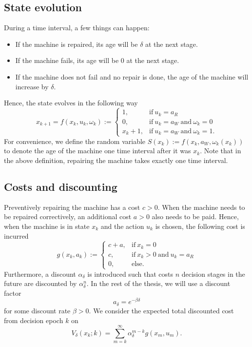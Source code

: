 \documentclass[a4paper]{thesis}
\theoremstyle{definition}
\begin{document}
\subsection{State evolution}
During a time interval, a few things can happen:
\begin{itemize}
	\item If the machine is repaired, its age will be $\delta$ at the next stage.
	\item If the machine fails, its age will be $0$ at the next stage.
	\item If the machine does not fail and no repair is done, the age of the machine will increase by $\delta$.
\end{itemize}
Hence, the state evolves in the following way
$$
x_{k+1}=f(x_k,u_k,\omega_k):=\begin{cases}
1,&\text{if}\ u_k=a_R \\
0,&\text{if}\ u_k=a_W\ \text{and}\ \omega_k=0 \\
x_k+1,&\text{if}\ u_k=a_W\ \text{and}\ \omega_k=1.
\end{cases}
$$
For convenience, we define the random variable $S(x_k):=f(x_k,a_W,\omega_k(x_k))$ to denote the age of the machine one time interval after it was $x_k$.
Note that in the above definition, repairing the machine takes exactly one time interval.

\subsection{Costs and discounting}
Preventively repairing the machine has a cost $c>0$.
When the machine needs to be repaired correctively, an additional cost $a>0$ also needs to be paid.
Hence, when the machine is in state $x_k$ and the action $u_k$ is chosen, the following cost is incurred
$$
g(x_k,a_k):=\begin{cases}
c+a,&\text{if}\ x_k=0 \\
c,&\text{if}\ x_k>0\ \text{and}\ u_k=a_R \\
0,&\text{else}.
\end{cases}
$$
Furthermore, a discount $\alpha_\delta$ is introduced such that costs $n$ decision stages in the future are discounted by $\alpha_\delta^n$.
In the rest of the thesis, we will use a discount factor
$$
a_\delta=e^{-\beta\delta}
$$
for some discount rate $\beta>0$.
We consider the expected total discounted cost from decision epoch $k$ on
$$
V_\delta(x_k;k)=\sum\limits_{m=k}^\infty \alpha_\delta^{m-k}g(x_m,u_m).
$$
\end{document}
